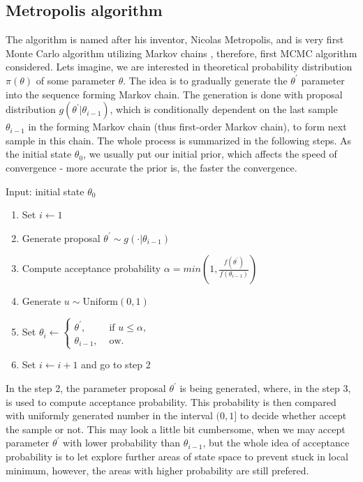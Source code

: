 \documentclass[
  digital, %
  table,   %
  twoside, %
  12pt,
  lof,     %
  lot,     %
]{fithesis3}
\begin{document}
\subsection{Metropolis algorithm}

The algorithm is named after his inventor, 
Nicolas Metropolis, and is very first Monte 
Carlo algorithm utilizing Markov chains 
\cite{metropolis1953}, therefore, first 
MCMC algorithm considered.
Lets imagine, we are interested in theoretical 
probability distribution $\pi(\theta)$ of 
some parameter $\theta$. 
The idea is to gradually generate the 
$\theta^\prime$ parameter into the sequence 
forming Markov chain. 
The generation is done with proposal distribution 
$g(\theta^\prime | \theta_{i-1})$, which is 
conditionally dependent on the last sample 
$\theta_{i-1}$ in the forming Markov chain 
(thus first-order Markov chain), to form 
next sample in this chain. 
The whole process is summarized in the 
following steps. As the initial state 
$\theta_0$, we usually put our initial prior, 
which affects the speed of convergence - 
more accurate the prior is, the faster the 
convergence.

Input: initial state $\theta_0$

\begin{enumerate}
  \item Set $i \leftarrow 1$
  \item Generate proposal $\theta^\prime \sim g(\cdot | \theta_{i-1})$
  \item Compute acceptance probability $\alpha = min\left(1, \frac{f(\theta^\prime)}{f(\theta_{i-1})}\right)$
  \item Generate $u \sim \text{Uniform}(0, 1)$
  \item Set $\theta_{i} \leftarrow \begin{cases}
    \theta^\prime, & \text{ if } u \leq \alpha,\\
    \theta_{i-1}, & \text{ ow.}
    \end{cases}
    $
  \item Set $i \leftarrow i + 1$ and go to step 2
\end{enumerate}

In the step 2, the parameter proposal $\theta^\prime$ 
is being generated, where, in the step 3, is used 
to compute acceptance probability. This probability 
is then compared with uniformly generated number in
the interval $(0, 1]$ to decide whether accept the 
sample or not. This may look a little bit cumbersome, 
when we may accept parameter $\theta^\prime$ with 
lower probability than $\theta_{i-1}$, but the 
whole idea of acceptance probability is to let 
explore further areas of state space to prevent 
stuck in local minimum, however, the areas with 
higher probability are still prefered.
\end{document}
